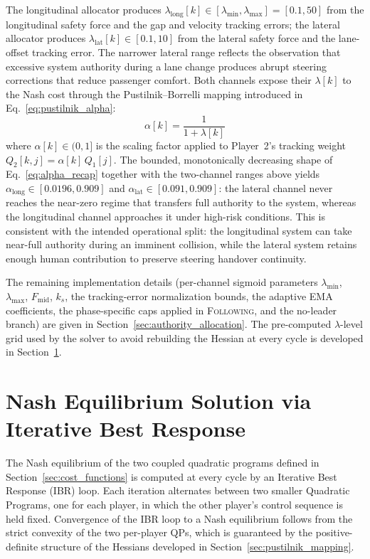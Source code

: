 \documentclass[12pt,a4paper,oneside]{report}
\begin{document}
The longitudinal allocator produces $\lambda_{\text{long}}[k] \in [\lambda_{\min}, \lambda_{\max}] = [0.1, 50]$ from the longitudinal safety force and the gap and velocity tracking errors; the lateral allocator produces $\lambda_{\text{lat}}[k] \in [0.1, 10]$ from the lateral safety force and the lane-offset tracking error. The narrower lateral range reflects the observation that excessive system authority during a lane change produces abrupt steering corrections that reduce passenger comfort. Both channels expose their $\lambda[k]$ to the Nash cost through the Pustilnik--Borrelli mapping introduced in Eq.~\eqref{eq:pustilnik_alpha}:
\begin{equation}
\alpha[k] = \frac{1}{1 + \lambda[k]}
\label{eq:alpha_recap}
\end{equation}
where $\alpha[k] \in (0, 1]$ is the scaling factor applied to Player~2's tracking weight $Q_2[k, j] = \alpha[k] \, Q_1[j]$. The bounded, monotonically decreasing shape of Eq.~\eqref{eq:alpha_recap} together with the two-channel ranges above yields $\alpha_{\text{long}} \in [0.0196, 0.909]$ and $\alpha_{\text{lat}} \in [0.091, 0.909]$: the lateral channel never reaches the near-zero regime that transfers full authority to the system, whereas the longitudinal channel approaches it under high-risk conditions. This is consistent with the intended operational split: the longitudinal system can take near-full authority during an imminent collision, while the lateral system retains enough human contribution to preserve steering handover continuity.

The remaining implementation details (per-channel sigmoid parameters $\lambda_{\min}$, $\lambda_{\max}$, $F_{\text{mid}}$, $k_s$, the tracking-error normalization bounds, the adaptive EMA coefficients, the phase-specific caps applied in \textsc{Following}, and the no-leader branch) are given in Section~\ref{sec:authority_allocation}. The pre-computed $\lambda$-level grid used by the solver to avoid rebuilding the Hessian at every cycle is developed in Section~\ref{sec:solution_algorithm}.

\section{Nash Equilibrium Solution via Iterative Best Response}
\label{sec:solution_algorithm}

The Nash equilibrium of the two coupled quadratic programs defined in Section~\ref{sec:cost_functions} is computed at every cycle by an Iterative Best Response (IBR) loop. Each iteration alternates between two smaller Quadratic Programs, one for each player, in which the other player's control sequence is held fixed. Convergence of the IBR loop to a Nash equilibrium follows from the strict convexity of the two per-player QPs, which is guaranteed by the positive-definite structure of the Hessians developed in Section~\ref{sec:pustilnik_mapping}.
\end{document}
